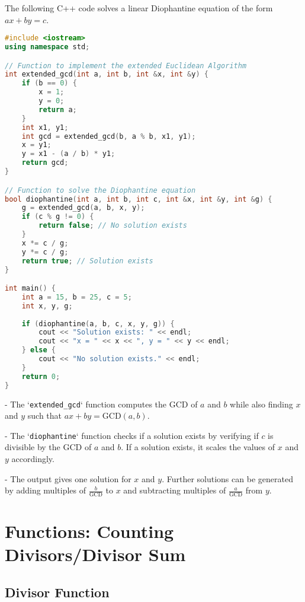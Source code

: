 \documentclass[10pt,a4paper]{article}
\begin{document}
The following C++ code solves a linear Diophantine equation of the form \(ax + by = c\).

\begin{lstlisting}[language=C++, mathescape=true]
#include <iostream>
using namespace std;

// Function to implement the extended Euclidean Algorithm
int extended_gcd(int a, int b, int &x, int &y) {
    if (b == 0) {
        x = 1;
        y = 0;
        return a;
    }
    int x1, y1;
    int gcd = extended_gcd(b, a % b, x1, y1);
    x = y1;
    y = x1 - (a / b) * y1;
    return gcd;
}

// Function to solve the Diophantine equation
bool diophantine(int a, int b, int c, int &x, int &y, int &g) {
    g = extended_gcd(a, b, x, y);
    if (c % g != 0) {
        return false; // No solution exists
    }
    x *= c / g;
    y *= c / g;
    return true; // Solution exists
}

int main() {
    int a = 15, b = 25, c = 5;
    int x, y, g;
    
    if (diophantine(a, b, c, x, y, g)) {
        cout << "Solution exists: " << endl;
        cout << "x = " << x << ", y = " << y << endl;
    } else {
        cout << "No solution exists." << endl;
    }
    return 0;
}
\end{lstlisting}

- The `\texttt{extended\_gcd}` function computes the GCD of \(a\) and \(b\) while also finding \(x\) and \(y\) such that \(ax + by = \text{GCD}(a, b)\).

- The `\texttt{diophantine}` function checks if a solution exists by verifying if \(c\) is divisible by the GCD of \(a\) and \(b\). If a solution exists, it scales the values of \(x\) and \(y\) accordingly.

- The output gives one solution for \(x\) and \(y\). Further solutions can be generated by adding multiples of \(\frac{b}{\text{GCD}}\) to \(x\) and subtracting multiples of \(\frac{a}{\text{GCD}}\) from \(y\).




\section*{Functions: Counting Divisors/Divisor Sum}

\subsection*{Divisor Function}
\end{document}
